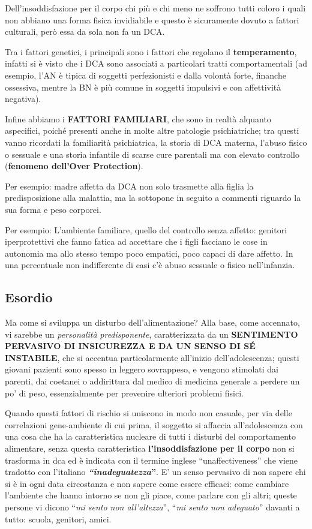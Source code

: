 Dell'insoddisfazione per il corpo chi più e chi meno ne soffrono tutti
coloro i quali non abbiano una forma fisica invidiabile e questo è
sicuramente dovuto a fattori culturali, però essa da sola non fa un DCA.

Tra i fattori genetici, i principali sono i fattori che regolano il
\textbf{temperamento}, infatti si è visto che i DCA sono associati a
particolari tratti comportamentali (ad esempio, l'AN è tipica di
soggetti perfezionisti e dalla volontà forte, finanche ossessiva, mentre
la BN è più comune in soggetti impulsivi e con affettività negativa).

Infine abbiamo i \textbf{FATTORI FAMILIARI}, che sono in realtà alquanto
aspecifici, poiché presenti anche in molte altre patologie
psichiatriche; tra questi vanno ricordati la familiarità psichiatrica,
la storia di DCA materna, l'abuso fisico o sessuale e una storia
infantile di scarse cure parentali ma con elevato controllo
(\textbf{fenomeno dell'Over Protection}).

Per esempio: madre affetta da DCA non solo trasmette alla figlia la
predisposizione alla malattia, ma la sottopone in seguito a commenti
riguardo la sua forma e peso corporei.

Per esempio: L'ambiente familiare, quello del controllo senza affetto:
genitori iperprotettivi che fanno fatica ad accettare che i figli
facciano le cose in autonomia ma allo stesso tempo poco empatici, poco
capaci di dare affetto. In una percentuale non indifferente di casi c'è
abuso sessuale o fisico nell'infanzia.

\subsection{Esordio}

Ma come si sviluppa un disturbo dell'alimentazione? Alla base, come
accennato, vi sarebbe un \emph{personalità} \emph{predisponente},
caratterizzata da un \textbf{SENTIMENTO PERVASIVO DI INSICUREZZA E DA UN
SENSO DI SÉ INSTABILE}, che si accentua particolarmente all'inizio
dell'adolescenza; questi giovani pazienti sono spesso in leggero
sovrappeso, e vengono stimolati dai parenti, dai coetanei o addirittura
dal medico di medicina generale a perdere un po' di peso, essenzialmente
per prevenire ulteriori problemi fisici.

Quando questi fattori di rischio si uniscono in modo non casuale, per
via delle correlazioni gene-ambiente di cui prima, il soggetto si
affaccia all'adolescenza con una cosa che ha la caratteristica nucleare
di tutti i disturbi del comportamento alimentare, senza questa
caratteristica \textbf{l'insoddisfazione per il corpo} non si trasforma
in dca ed è indicata con il termine inglese ``unaffectiveness'' che
viene tradotto con l'italiano \textbf{\emph{\emph{``inadeguatezza}}''}.
E' un senso pervasivo di non sapere chi si è in ogni data circostanza e
non sapere come essere efficaci: come cambiare l'ambiente che hanno
intorno se non gli piace, come parlare con gli altri; queste persone vi
dicono ``\emph{mi sento non all'altezza}'', ``\emph{mi sento non
adeguato}'' davanti a tutto: scuola, genitori, amici.

